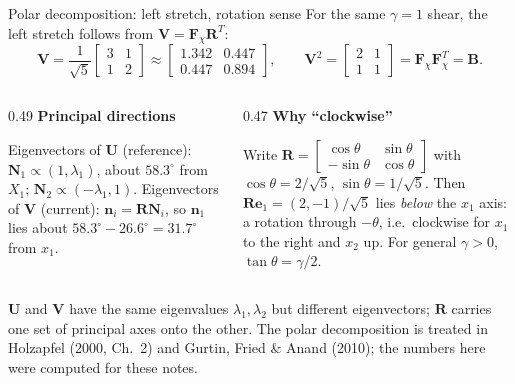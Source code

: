 \documentclass[aspectratio=169,11pt]{beamer}
\newcommand{\Fdef}{\bm{F}_{\chi}}
\newcommand{\Bten}{\bm{B}}
\begin{document}
\begin{frame}{Polar decomposition: left stretch, rotation sense}
\small
For the same \(\gamma=1\) shear, the left stretch follows from \(\bm{V}=\Fdef\bm{R}^T\):
\[
  \bm{V}=\frac{1}{\sqrt5}\begin{bmatrix}3&1\\1&2\end{bmatrix}
  \approx\begin{bmatrix}1.342&0.447\\0.447&0.894\end{bmatrix},
  \qquad
  \bm{V}^2=\begin{bmatrix}2&1\\1&1\end{bmatrix}=\Fdef\Fdef^T=\Bten .
\]
\begin{columns}[T,onlytextwidth]
\begin{column}{0.49\textwidth}
\textbf{Principal directions}

Eigenvectors of \(\bm{U}\) (reference): \(\bm{N}_1\propto(1,\lambda_1)\), about \(58.3^\circ\) from \(X_1\); \(\bm{N}_2\propto(-\lambda_1,1)\).
Eigenvectors of \(\bm{V}\) (current): \(\bm{n}_i=\bm{R}\bm{N}_i\), so \(\bm{n}_1\) lies about \(58.3^\circ-26.6^\circ=31.7^\circ\) from \(x_1\).
\end{column}
\begin{column}{0.47\textwidth}
\textbf{Why ``clockwise''}

Write \(\bm{R}=\begin{bmatrix}\cos\theta&\sin\theta\\-\sin\theta&\cos\theta\end{bmatrix}\) with \(\cos\theta=2/\sqrt5\), \(\sin\theta=1/\sqrt5\). Then \(\bm{R}\bm{e}_1=(2,-1)/\sqrt5\) lies \emph{below} the \(x_1\) axis: a rotation through \(-\theta\), i.e.\ clockwise for \(x_1\) to the right and \(x_2\) up. For general \(\gamma>0\), \(\tan\theta=\gamma/2\).
\end{column}
\end{columns}
\medskip
\begin{punchbox}
\footnotesize
\(\bm{U}\) and \(\bm{V}\) have the same eigenvalues \(\lambda_1,\lambda_2\) but different eigenvectors; \(\bm{R}\) carries one set of principal axes onto the other. The polar decomposition is treated in Holzapfel (2000, Ch.~2) and Gurtin, Fried \& Anand (2010); the numbers here were computed for these notes.
\end{punchbox}
\end{frame}
\end{document}
